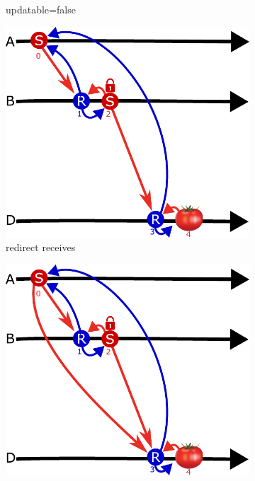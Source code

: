 \documentclass[a4paper,USenglish,cleveref, autoref, thm-restate, anonymous]{lipics-v2021}
\begin{document}
\begin{figure}[t]
\begin{subfigure}{.19\textwidth}
  \caption{updatable=false}
  \label{fig:updatable}
\end{subfigure}
\begin{subfigure}{.19\textwidth}
  \centering
  \includegraphics[width=\linewidth]{figs/sends_and_receives_proof_receive_redirect.pdf}  
  \caption{redirect receives}
  \label{fig:redirect}
\end{subfigure}
\begin{subfigure}{.19\textwidth}
  \centering
  \includegraphics[width=\linewidth]{figs/sends_and_receives_proof.pdf}  

\end{subfigure}
\end{figure}
\end{document}
